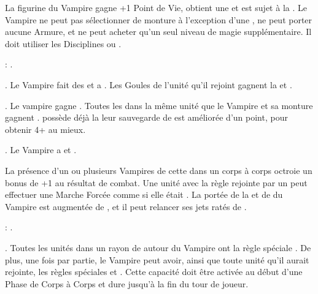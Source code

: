 
\noindent\parbox{\columnwidth}{
La figurine du Vampire \strigoi{} gagne +1 Point de Vie, obtient une  et est sujet à la \hatred{}. Le Vampire ne peut pas sélectionner de monture à l'exception d'une \shriekinghorror{}, ne peut porter aucune Armure, et ne peut acheter qu'un seul niveau de magie supplémentaire. Il doit utiliser les Disciplines \wilderness{} ou \necromancy{}.

\bloodties{}: \ghouls{}.
}

\startpricelist

 \textbf{\ancientbloodpower}. Le Vampire fait des \poisonedattacks{} et a . Les Goules de l'unité qu'il rejoint gagnent la \hatred{} et .

 \textbf{\bloodlinepower}. Le vampire gagne . Toutes les \ghouls{} dans la même unité que le Vampire et sa monture gagnent .  possède déjà la \regeneration{} leur sauvegarde de \regeneration{} est améliorée d'un point, pour obtenir 4+ au mieux.

 \textbf{\bloodlinepower}. Le Vampire a \thunderouscharge{} et .

\endpricelist

\separator


\noindent\parbox{\columnwidth}{
La présence d'un ou plusieurs Vampires de cette \bloodline{} dans un corps à corps octroie un bonus de +1 au résultat de combat. Une unité avec la règle \undead{} rejointe par un \vonkarnstein{} peut effectuer une Marche Forcée comme si elle était \vampiric{}. La portée de la \inspiringpresence{} et de \holdyourground{} du Vampire est augmentée de , et il peut relancer ses jets ratés de \vampiric{}. 

\bloodties{}: \darkcoach{}.
}

\startpricelist

 \textbf{\ancientbloodpower}. Toutes les unités dans un rayon de  autour du Vampire ont la règle spéciale \hardtarget{}. De plus, une fois par partie, le Vampire peut avoir, ainsi que toute unité qu'il aurait rejointe, les règles spéciales \lightningattacks{} et . Cette capacité doit être activée au début d'une Phase de Corps à Corps et dure jusqu'à la fin du tour de joueur.

